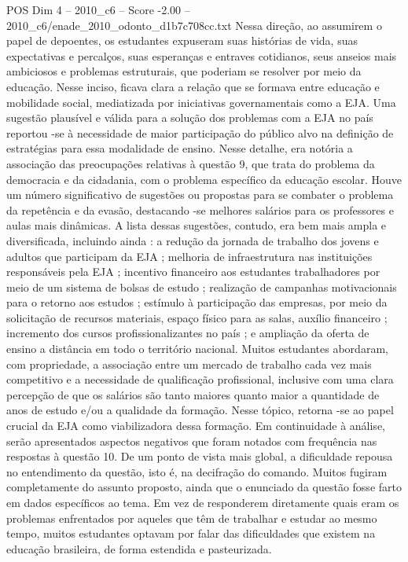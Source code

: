 \begin{textsample}{POS Dim 4 – 2010\_c6 – Score -2.00 – 2010\_c6/enade\_2010\_odonto\_d1b7c708cc.txt}
Nessa direção, ao assumirem o papel de depoentes, os estudantes expuseram suas histórias de vida, suas expectativas e percalços, suas esperanças e entraves cotidianos, seus anseios mais ambiciosos e problemas estruturais, que poderiam se resolver por meio da educação.
Nesse inciso, ficava clara a relação que se formava entre educação e mobilidade social, mediatizada por iniciativas governamentais como a EJA.
Uma sugestão plausível e válida para a solução dos problemas com a EJA no país reportou -se à necessidade de maior participação do público alvo na definição de estratégias para essa modalidade de ensino.
Nesse detalhe, era notória a associação das preocupações relativas à questão 9, que trata do problema da democracia e da cidadania, com o problema específico da educação escolar.
Houve um número significativo de sugestões ou propostas para se combater o problema da repetência e da evasão, destacando -se melhores salários para os professores e aulas mais dinâmicas.
A lista dessas sugestões, contudo, era bem mais ampla e diversificada, incluindo ainda : a redução da jornada de trabalho dos jovens e adultos que participam da EJA ; melhoria de infraestrutura nas instituições responsáveis pela EJA ; incentivo financeiro aos estudantes trabalhadores por meio de um sistema de bolsas de estudo ; realização de campanhas motivacionais para o retorno aos estudos ; estímulo à participação das empresas, por meio da solicitação de recursos materiais, espaço físico para as salas, auxílio financeiro ; incremento dos cursos profissionalizantes no país ; e ampliação da oferta de ensino a distância em todo o território nacional.
Muitos estudantes abordaram, com propriedade, a associação entre um mercado de trabalho cada vez mais competitivo e a necessidade de qualificação profissional, inclusive com uma clara percepção de que os salários são tanto maiores quanto maior a quantidade de anos de estudo e/ou a qualidade da formação.
Nesse tópico, retorna -se ao papel crucial da EJA como viabilizadora dessa formação.
Em continuidade à análise, serão apresentados aspectos negativos que foram notados com frequência nas respostas à questão 10.
De um ponto de vista mais global, a dificuldade repousa no entendimento da questão, isto é, na decifração do comando.
Muitos fugiram completamente do assunto proposto, ainda que o enunciado da questão fosse farto em dados específicos ao tema.
Em vez de responderem diretamente quais eram os problemas enfrentados por aqueles que têm de trabalhar e estudar ao mesmo tempo, muitos estudantes optavam por falar das dificuldades que existem na educação brasileira, de forma estendida e pasteurizada.

\end{textsample}
